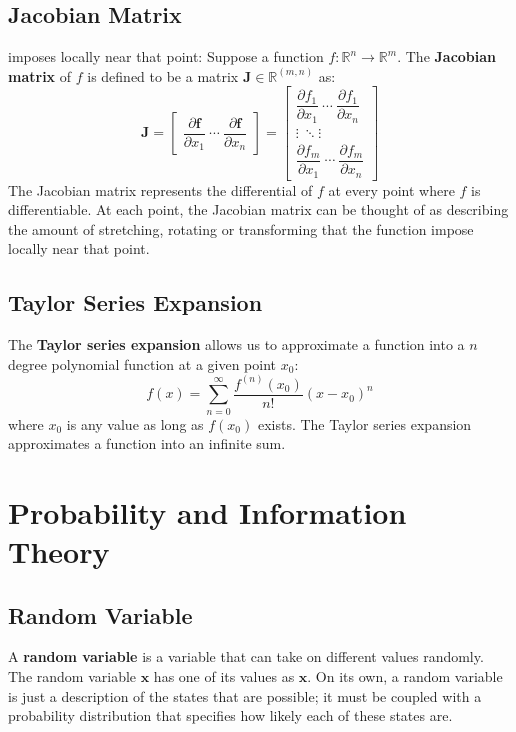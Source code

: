\documentclass[12pt]{report}
\begin{document}
    \section{Jacobian Matrix} imposes locally near that point:
    Suppose a function $f:\mathbb{R}^n \rightarrow \mathbb{R}^m$. The \textbf{Jacobian matrix} of $f$ is defined to be a matrix $\boldsymbol{J} \in \mathbb{R}^(m,n)$ as:
    \begin{equation}
        \displaystyle \mathbf {J} ={\begin{bmatrix}{\dfrac {\partial \mathbf {f} }{\partial x_{1}}}~\cdots~{\dfrac {\partial \mathbf {f} }{\partial x_{n}}}\end{bmatrix}}={\begin{bmatrix}{\dfrac {\partial f_{1}}{\partial x_{1}}}~\cdots~{\dfrac {\partial f_{1}}{\partial x_{n}}}\\\vdots~\ddots\vdots~\\{\dfrac {\partial f_{m}}{\partial x_{1}}}~\cdots~{\dfrac {\partial f_{m}}{\partial x_{n}}}\end{bmatrix}}
    \end{equation}
     The Jacobian matrix represents the differential of $f$ at every point where $f$ is differentiable. At each point, the Jacobian matrix can be thought of as describing the amount of stretching, rotating or transforming that the function impose locally near that point.
     
    \section{Taylor Series Expansion}
    The \textbf{Taylor series expansion} allows us to approximate a function into a $n$ degree polynomial function at a given point $x_0$:
    \begin{equation}
        f(x) = \sum_{n = 0}^{\infty}{\frac{f^{(n)}(x_0)}{n!}(x - x_0)^n}
    \end{equation}
    where $x_0$ is any value as long as $f(x_0)$ exists.
    The Taylor series expansion approximates a function into an infinite sum.
    
\chapter{Probability and Information Theory}
    \section{Random Variable}
    A \textbf{random variable} is a variable that can take on different values randomly.
    The random variable $\mathbf{x}$ has one of its values as $\boldsymbol{x}$. On its own, a random variable is just a description of the states that are possible; it must be coupled with a probability distribution that specifies how likely each of these states are.
\end{document}
